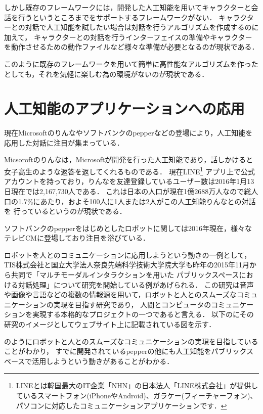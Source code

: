 しかし既存のフレームワークには，開発した人工知能を用いてキャラクターと会話を行うというところまでをサポートするフレームワークがない．
キャラクターとの対話で人工知能を試したい場合は対話を行うアルゴリズムを作成するのに加えて，
キャラクターとの対話を行うインターフェイスの準備やキャラクターを動作させるための動作ファイルなど様々な準備が必要となるのが現状である．

このように既存のフレームワークを用いて簡単に高性能なアルゴリズムを作ったとしても，それを気軽に楽しむ為の環境がないのが現状である．

\newpage

\section{人工知能のアプリケーションへの応用}
現在Microsoftのりんな\cite{rinna}やソフトバンクのpepper\cite{pepper}などの登場により，人工知能を応用した対話に注目が集まっている．

Micsoroftのりんなは，Microsoftが開発を行った人工知能であり，話しかけると女子高生のような返答を返してくれるものである．
現在LINE\footnote{LINEとは韓国最大のIT企業「NHN」の日本法人「LINE株式会社」が提供しているスマートフォン(iPhoneやAndroid)、ガラケー(フィーチャーフォン)、パソコンに対応したコミュニケーションアプリケーションです．\cite{line}}
アプリ上で公式アカウントを持っており，りんなを友達登録しているユーザー数は2016年1月13日現在では2,167,730人である．
これは日本の人口が現在1億2688万人\cite{humen}なので総人口の1.7\%にあたり，およそ100人に1人または2人がこの人工知能りんなとの対話を
行っているというのが現状である．

ソフトバンクのpepperをはじめとしたロボットに関しては2016年現在，様々なテレビCMに登場しており注目を浴びている．

ロボットを人とのコミュニケーションに応用しようという動きの一例として，
TIS株式会社と国立大学法人奈良先端科学技術大学院大学も昨年の2015年11月から共同で「マルチモーダルインタラクションを用いた
パブリックスペースにおける対話処理」について研究を開始している例があげられる．\cite{tis}
この研究は音声や画像や言語などの複数の情報源を用いて，ロボットと人とのスムーズなコミュニケーションの実現を目指す研究であり，
人間とコンピュータのコミュニケーションを実現する本格的なプロジェクトの一つであると言える．
以下のにその研究のイメージとしてウェブサイト上に記載されている図を示す．


のようにロボットと人とのスムーズなコミュニケーションの実現を目指していることがわかり，
すでに開発されているpepperの他にも人工知能をパブリックスペースで活用しようという動きがあることがわかる．

